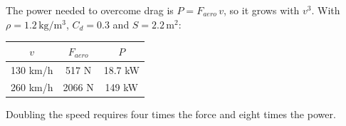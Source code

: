 \begin{examplebox}
The power needed to overcome drag is $P = F_{aero}\, v$, so it grows with $v^3$. With $\rho = 1.2\,\mathrm{kg/m^3}$, $C_d = 0.3$ and $S = 2.2\,\mathrm{m^2}$:
\begin{center}
\begin{tabular}{c|c|c}
$v$ & $F_{aero}$ & $P$ \\ \hline
130 km/h & 517 N & 18.7 kW \\
260 km/h & 2066 N & 149 kW
\end{tabular}
\end{center}
Doubling the speed requires four times the force and eight times the power.
\end{examplebox}
